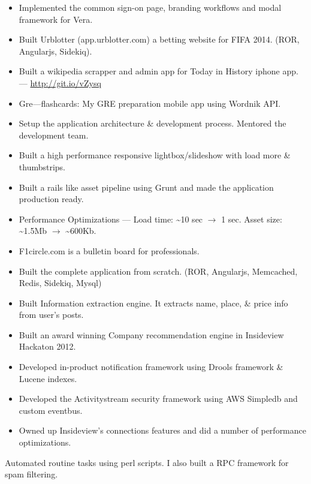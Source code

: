 \documentclass{resume}
\begin{document}
\begin{itemize} \itemsep1pt \parskip0pt
  \item Implemented the common sign-on page, branding workflows and modal framework for Vera.
  \item Built Urblotter (app.urblotter.com) a betting website for FIFA 2014. (ROR, Angularjs, Sidekiq).
  \item Built a wikipedia scrapper and admin app for Today in History iphone app. --- \url{http://git.io/vZysq}
  \item Gre---flashcards: My GRE preparation mobile app using Wordnik API\@.
\end{itemize}
\begin{itemize} \itemsep1pt \parskip0pt
  \item Setup the application architecture \& development process. Mentored the development team.
  \item Built a high performance responsive lightbox/slideshow with load more \& thumbstrips.
  \item Built a rails like asset pipeline using Grunt and made the application production ready.
  \item Performance Optimizations --- Load time: \textasciitilde10 sec \( \rightarrow \) 1 sec.  
    Asset size: \textasciitilde1.5Mb \( \rightarrow \) \textasciitilde600Kb.
\end{itemize}
\begin{itemize} \itemsep1pt \parskip0pt
  \item F1circle.com is a bulletin board for professionals.
  \item Built the complete application from scratch. (ROR, Angularjs, Memcached, Redis, Sidekiq, Mysql)
  \item Built Information extraction engine. It extracts name, place, \& price info from user's posts.
\end{itemize}
\begin{itemize} \itemsep1pt \parskip0pt
  \item Built an award winning Company recommendation engine in Insideview Hackaton 2012.
  \item Developed in-product notification framework using Drools framework \& Lucene indexes.
  \item Developed the Activitystream security framework using AWS Simpledb and custom eventbus.
  \item Owned up Insideview's connections features and did a number of performance optimizations.
\end{itemize}
Automated routine tasks using perl scripts.  I also built a RPC framework for spam filtering.
 
\end{document}
